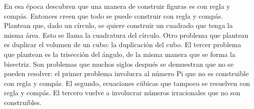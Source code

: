 En esa época descubren que una manera de construir figuras es con regla y compás. Entonces creen que todo se puede construir con regla y compás. Plantean que, dado un círculo, se quiere construir un cuadrado que tenga la misma área. Esto se llama la cuadratura del círculo. Otro problema que plantean es duplicar el volumen de un cubo: la duplicación del cubo. El tercer problema que plantean es la trisección del ángulo, de la misma manera que se forma la bisectriz. Son problemas que muchos siglos después se demuestran que no se pueden resolver: el primer problema involucra al número Pi que no es construible con regla y compás. El segundo, ecuaciones cúbicas que tampoco se resuelven con regla y compás. El tercero vuelve a involucrar números irracionales que no son construibles.